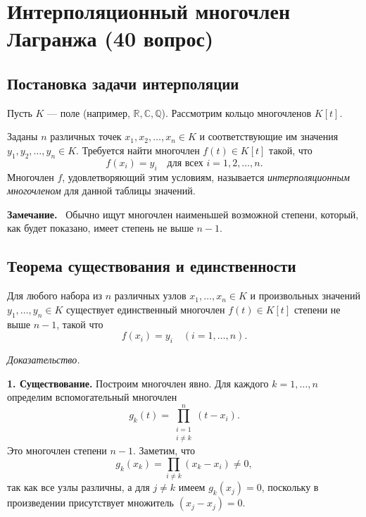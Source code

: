 \documentclass[a4paper,12pt]{article}
\newcommand{\myremark}{\textbf{Замечание.}\ }
\theoremstyle{definition}
\theoremstyle{plain}
\theoremstyle{remark}
\begin{document}
	
	
	
	
	\newpage
	\section{Интерполяционный многочлен Лагранжа (40 вопрос)}
	
	\subsection{Постановка задачи интерполяции}
	
	Пусть \( K \) — поле (например, \( \mathbb{R}, \mathbb{C}, \mathbb{Q} \)). Рассмотрим кольцо многочленов \( K[t] \).
	
	\begin{tcolorbox}[colback=blue!5, colframe=blue!40!black, title=Задача интерполяции]
		Заданы \( n \) различных точек \( x_1, x_2, \dots, x_n \in K \) и соответствующие им значения \( y_1, y_2, \dots, y_n \in K \). Требуется найти многочлен \( f(t) \in K[t] \) такой, что
		\[
		f(x_i) = y_i \quad \text{для всех } i = 1, 2, \dots, n.
		\]
		Многочлен \( f \), удовлетворяющий этим условиям, называется \textit{интерполяционным многочленом} для данной таблицы значений.
	\end{tcolorbox}
	
	\myremark
	Обычно ищут многочлен наименьшей возможной степени, который, как будет показано, имеет степень не выше \( n-1 \).
	
	\subsection{Теорема существования и единственности}
	
	\begin{tcolorbox}[colback=green!5, colframe=green!50!black, title=Теорема Лагранжа]
		Для любого набора из \( n \) различных узлов \( x_1, \dots, x_n \in K \) и произвольных значений \( y_1, \dots, y_n \in K \) существует единственный многочлен \( f(t) \in K[t] \) степени не выше \( n-1 \), такой что
		\[
		f(x_i) = y_i \quad (i = 1, \dots, n).
		\]
	\end{tcolorbox}
	
	\medskip
	\textit{Доказательство.}
	
	\textbf{1. Существование.} Построим многочлен явно. Для каждого \( k = 1, \dots, n \) определим вспомогательный многочлен
	\[
	g_k(t) = \prod_{\substack{i=1 \\ i \neq k}}^n (t - x_i).
	\]
	Это многочлен степени \( n-1 \). Заметим, что
	\[
	g_k(x_k) = \prod_{i \neq k} (x_k - x_i) \neq 0,
	\]
	так как все узлы различны, а для \( j \neq k \) имеем \( g_k(x_j) = 0 \), поскольку в произведении присутствует множитель \( (x_j - x_j) = 0 \).
	
\end{document}
